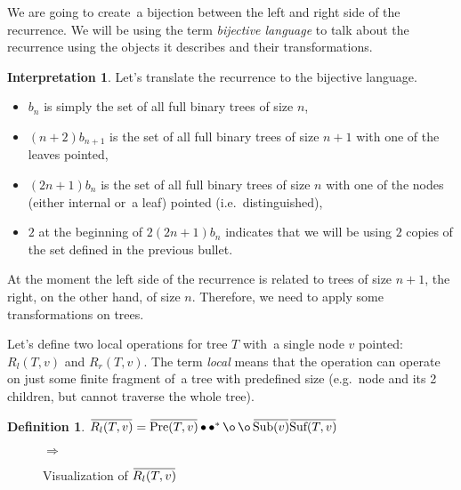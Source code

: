 \documentclass[final]{article}
\theoremstyle{definition}
\newtheorem{definition}{Definition}[subsection]
\theoremstyle{definition}
\newtheorem{interpretation}{Interpretation}[subsection]
\theoremstyle{remark}
\newcommand{\ols}[1]{\mskip.5\thinmuskip\overline{\mskip-.5\thinmuskip {#1} \mskip-.5\thinmuskip}\mskip.5\thinmuskip} %
\newcommand{\enc}[1]{\ensuremath{\ols{#1}}}
\newcommand{\pointed}[1]{\ensuremath{{#1}^*}}
\DeclareMathOperator{\tSub}{\text{Sub}}
\DeclareMathOperator{\tPre}{\text{Pre}}
\DeclareMathOperator{\tSuf}{\text{Suf}}
\DeclareMathOperator{\n}{\bullet}
\DeclareMathOperator{\no}{\o}
\begin{document}
We are going to create~a bijection between the left and right side of the recurrence. We will be using the term \textit{bijective language} to talk about the recurrence using the objects it describes and their transformations.

\begin{interpretation}
Let's translate the recurrence to the bijective language.
\begin{itemize}
    \item \(b_n\) is simply the set of all full binary trees of size \(n\),
    \item \((n + 2) b_{n + 1}\) is the set of all full binary trees of size \(n + 1\) with one of the leaves pointed,
    \item \((2n + 1) b_{n}\) is the set of all full binary trees of size \(n\) with one of the nodes (either internal or~a leaf) pointed (i.e.~distinguished),
    \item \(2\) at the beginning of \(2 (2n + 1) b_{n}\) indicates that we will be using \(2\) copies of the set defined in the previous bullet.
\end{itemize}

At the moment the left side of the recurrence is related to trees of size \(n + 1\), the right, on the other hand, of size \(n\). Therefore, we need to apply some transformations on trees.

Let's define two local operations for tree \(T\) with~a single node \(v\) pointed: \(R_l(T, v)\) and \(R_r(T, v)\). The term \textit{local} means that the operation can operate on just some finite fragment of~a tree with predefined size (e.g.~node and its 2 children, but cannot traverse the whole tree).

\begin{definition}
    \(\enc{R_l(T, v)} = \enc{\tPre(T, v)} \n \pointed{\n} \no \no \enc{\tSub(v)} \enc{\tSuf(T, v)}\)
\end{definition}

\begin{figure}[H]
    \centering
    \begin{minipage}{.25\textwidth}\end{minipage}%
    \(\Rightarrow\)
    \begin{minipage}{.4\textwidth}\end{minipage}%
    \caption{Visualization of \(\enc{R_l(T, v)}\)}
    \label{fig:remy_left}
\end{figure}


\end{interpretation}
\end{document}
